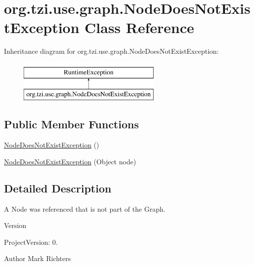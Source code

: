 \hypertarget{classorg_1_1tzi_1_1use_1_1graph_1_1_node_does_not_exist_exception}{\section{org.\-tzi.\-use.\-graph.\-Node\-Does\-Not\-Exist\-Exception Class Reference}
\label{classorg_1_1tzi_1_1use_1_1graph_1_1_node_does_not_exist_exception}
}
Inheritance diagram for org.\-tzi.\-use.\-graph.\-Node\-Does\-Not\-Exist\-Exception\-:\begin{figure}[H]
\begin{center}
\leavevmode
\includegraphics[height=2.000000cm]{classorg_1_1tzi_1_1use_1_1graph_1_1_node_does_not_exist_exception}
\end{center}
\end{figure}
\subsection*{Public Member Functions}
\begin{DoxyCompactItemize}
\item 
\hyperlink{classorg_1_1tzi_1_1use_1_1graph_1_1_node_does_not_exist_exception_aac1159146a3822d8454b61d83a2d11b8}{Node\-Does\-Not\-Exist\-Exception} ()
\item 
\hyperlink{classorg_1_1tzi_1_1use_1_1graph_1_1_node_does_not_exist_exception_a4e6cb94903543985f164caf6f03b1d97}{Node\-Does\-Not\-Exist\-Exception} (Object node)
\end{DoxyCompactItemize}


\subsection{Detailed Description}
A Node was referenced that is not part of the Graph.

\begin{DoxyVersion}{Version}

\end{DoxyVersion}
\begin{DoxyParagraph}{Project\-Version\-:}
0. 
\end{DoxyParagraph}
\begin{DoxyAuthor}{Author}
Mark Richters 
\end{DoxyAuthor}


